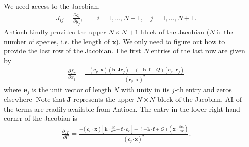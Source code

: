 \documentclass{article}
\newcommand{\lr}[1]{\left(#1\right)}
\begin{document}
  We need access to the Jacobian,
  \begin{align}
    J_{ij} = \frac{\partial g_{i}}{\partial y_{j}}, \qquad i = 1, \ldots, N+1, \quad j = 1, \ldots, N+1.
  \end{align}
  Antioch kindly provides the upper $N\times N+1$ block of the Jacobian ($N$ is the number of species, 
  i.e. the length of $\mathbf{x}$).  We only need to figure out how to provide the last row of the 
  Jacobian.  The first $N$ entries of the last row are given by 
  \begin{align}
    \frac{\partial f_{T}}{\partial x_{j}} = 
      \frac{\displaystyle -\lr{\mathbf{c}_{p}\cdot\mathbf{x}}\lr{\mathbf{h}\cdot\mathbf{J}\mathbf{e}_{j}} - 
             \lr{-\mathbf{h}\cdot\mathbf{f} + Q}\lr{\mathbf{c}_{p}\cdot\mathbf{e}_{j}}}
           {\lr{\displaystyle \mathbf{c}_{p}\cdot\mathbf{x}}^{2}}
  \end{align}
  where $\mathbf{e}_{j}$ is the unit vector of length $N$  with unity in its $j$-th entry and zeros elsewhere.  
  Note that $\mathbf{J}$ represents the upper $N\times N$ block of the Jacobian. All of 
  the terms are readily available from Antioch.  The entry in the lower right hand corner of the 
  Jacobian is 
  \begin{align}
    \frac{\partial f_{T}}{\partial T} = 
      \frac{\displaystyle -\lr{\mathbf{c}_{p}\cdot\mathbf{x}}\left[\mathbf{h}
              \cdot\frac{\partial \mathbf{f}}{\partial T} + \mathbf{f}\cdot\mathbf{c}_{p}\right] - 
            \lr{-\mathbf{h}\cdot\mathbf{f} + Q}\lr{\mathbf{x}\cdot\frac{\partial \mathbf{c}_{p}}{\partial T}}}
           {\displaystyle \lr{\mathbf{c}_{p}\cdot\mathbf{x}}^{2}}.
  \end{align}
\end{document}

